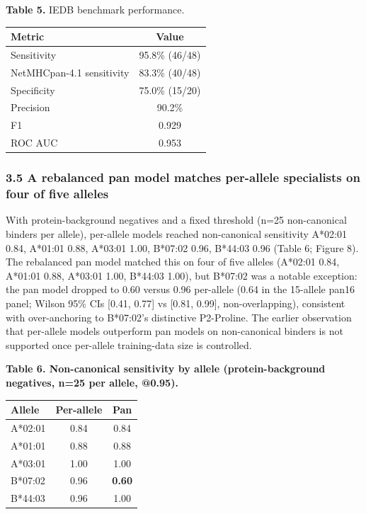 \documentclass[10pt]{article}
\newcounter{none} %
\begin{document}
\textbf{Table 5.} IEDB benchmark performance.

{\def\LTcaptype{none} %
\begin{longtable}[]{@{}lc@{}}
\toprule\noalign{}
Metric & Value \\
\midrule\noalign{}
\endhead
\bottomrule\noalign{}
\endlastfoot
Sensitivity & 95.8\% (46/48) \\
NetMHCpan-4.1 sensitivity & 83.3\% (40/48) \\
Specificity & 75.0\% (15/20) \\
Precision & 90.2\% \\
F1 & 0.929 \\
ROC AUC & 0.953 \\
\end{longtable}
}

\subsubsection{3.5 A rebalanced pan model matches per-allele specialists
on four of five
alleles}\label{a-rebalanced-pan-model-matches-per-allele-specialists-on-four-of-five-alleles}

With protein-background negatives and a fixed threshold (n=25
non-canonical binders per allele), per-allele models reached
non-canonical sensitivity A*02:01 0.84, A*01:01 0.88, A*03:01 1.00,
B*07:02 0.96, B*44:03 0.96 (Table 6; Figure 8). The rebalanced pan model
matched this on four of five alleles (A*02:01 0.84, A*01:01 0.88,
A*03:01 1.00, B*44:03 1.00), but B*07:02 was a notable exception: the
pan model dropped to 0.60 versus 0.96 per-allele (0.64 in the 15-allele pan16 panel; Wilson 95\% CIs
{[}0.41, 0.77{]} vs {[}0.81, 0.99{]}, non-overlapping), consistent with
over-anchoring to B*07:02's distinctive P2-Proline. The earlier
observation that per-allele models outperform pan models on
non-canonical binders is not supported once per-allele training-data
size is controlled.

\textbf{Table 6. Non-canonical sensitivity by allele (protein-background
negatives, n=25 per allele, @0.95).}

{\def\LTcaptype{none} %
\begin{longtable}[]{@{}lcc@{}}
\toprule\noalign{}
Allele & Per-allele & Pan \\
\midrule\noalign{}
\endhead
\bottomrule\noalign{}
\endlastfoot
A*02:01 & 0.84 & 0.84 \\
A*01:01 & 0.88 & 0.88 \\
A*03:01 & 1.00 & 1.00 \\
B*07:02 & 0.96 & \textbf{0.60} \\
B*44:03 & 0.96 & 1.00 \\
\end{longtable}
}
\end{document}

